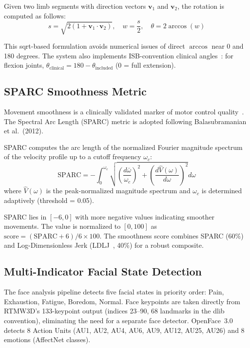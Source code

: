 Given two limb segments with direction vectors $\mathbf{v}_1$ and $\mathbf{v}_2$, the rotation is computed as follows:
\begin{equation}
    s = \sqrt{2(1 + \mathbf{v}_1 \cdot \mathbf{v}_2)}, \quad w = \frac{s}{2}, \quad \theta = 2 \arccos(w)
    \label{eq:quaternion}
\end{equation}

This sqrt-based formulation avoids numerical issues of direct $\arccos$ near 0 and 180 degrees. The system also implements ISB-convention clinical angles~\cite{Wu2002}: for flexion joints, $\theta_{\text{clinical}} = 180 - \theta_{\text{included}}$ (0 = full extension).


\subsection{SPARC Smoothness Metric}
\label{subsec:sparc}

Movement smoothness is a clinically validated marker of motor control quality~\cite{Scholp2021}. The Spectral Arc Length (SPARC) metric is adopted following Balasubramanian et al.~(2012).

SPARC computes the arc length of the normalized Fourier magnitude spectrum of the velocity profile up to a cutoff frequency $\omega_c$:
\begin{equation}
    \text{SPARC} = -\int_0^{\omega_c} \sqrt{\left(\frac{d\bar{\omega}}{\omega_c}\right)^2 + \left(\frac{d\hat{V}(\omega)}{d\omega}\right)^2} d\omega
    \label{eq:sparc}
\end{equation}
where $\hat{V}(\omega)$ is the peak-normalized magnitude spectrum and $\omega_c$ is determined adaptively (threshold = 0.05).

SPARC lies in $[-6, 0]$ with more negative values indicating smoother movements. The value is normalized to $[0, 100]$ as $\text{score} = (\text{SPARC} + 6) / 6 \times 100$. The smoothness score combines SPARC (60\%) and Log-Dimensionless Jerk (LDLJ~\cite{Rohrer2002}, 40\%) for a robust composite.


\subsection{Multi-Indicator Facial State Detection}
\label{subsec:pain}

The face analysis pipeline detects five facial states in priority order: Pain, Exhaustion, Fatigue, Boredom, Normal. Face keypoints are taken directly from RTMW3D's 133-keypoint output (indices 23--90, 68 landmarks in the dlib convention), eliminating the need for a separate face detector. OpenFace~3.0 detects 8 Action Units (AU1, AU2, AU4, AU6, AU9, AU12, AU25, AU26) and 8 emotions (AffectNet classes).


